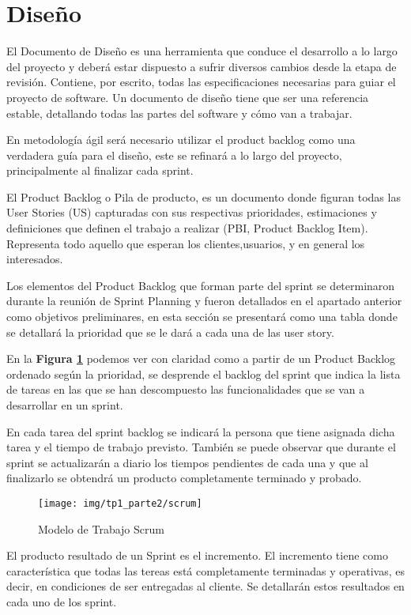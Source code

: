 
\section{Diseño}

El Documento de Diseño es una herramienta que conduce el desarrollo a lo largo del proyecto y deberá estar dispuesto a sufrir diversos cambios desde la etapa de revisión. Contiene, por escrito, todas las especificaciones necesarias para guiar el proyecto de software. Un documento de diseño tiene que ser una referencia estable, detallando todas las partes del software y cómo van a trabajar.

En metodología ágil será necesario utilizar el product backlog como una verdadera guía para el diseño, este se refinará a lo largo del proyecto, principalmente al finalizar cada sprint.

El Product Backlog o Pila de producto, es un documento donde figuran todas las User Stories (US) capturadas con sus respectivas prioridades, estimaciones y definiciones que definen el  trabajo a realizar (PBI, Product Backlog Item).
Representa todo aquello que esperan los clientes,usuarios, y en general los interesados.

Los elementos del Product Backlog que forman parte del sprint se determinaron durante la reunión de Sprint Planning y fueron detallados en el apartado anterior como objetivos preliminares, en esta sección se presentará como una tabla donde se detallará la prioridad que se le dará a cada una de las user story.

En la \textbf{Figura \ref{scrum}} podemos ver con claridad como a partir de un Product Backlog ordenado según la prioridad, se desprende el backlog del sprint que indica la lista de tareas en las que se han descompuesto las funcionalidades que se van a desarrollar en un sprint. 

En cada tarea del sprint backlog se indicará la persona que tiene asignada dicha tarea y el tiempo de trabajo previsto. También se puede observar que durante el sprint se actualizarán a diario los tiempos pendientes de cada una y que al finalizarlo se obtendrá un producto completamente terminado y probado.
\begin{figure}[h]
  \centering
  \texttt{[image: img/tp1\_parte2/scrum]}
  \caption{Modelo de Trabajo Scrum}
  \label{scrum}
\end{figure}

El producto resultado de un Sprint es el incremento. El incremento tiene como característica que todas las tereas está completamente terminadas y operativas, es decir, en condiciones de ser  entregadas  al cliente. Se detallarán estos resultados en cada uno de los sprint.

